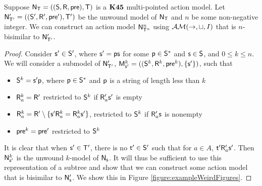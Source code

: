 \begin{lemma} \label{lemma:unwoundModelBisimilarConstruct}
  Suppose $\evM_\evT = ((\evS,\evR,\evpr),\evT)$ is a $\AXKFF$ multi-pointed
  action model.
	Let $\evM'_{\evT'} = ((\evS',\evR',\evpr'),\evT')$ be the unwound model of
  $\evM_\evT$ and $n$ be some non-negative integer.
	We can construct an action model $\evM^{n}_{\evT^{n}}$ using $\EM(\to,\sqcup,I)$ that is $n$-bisimilar to
  $\evM'_{\evT'}$.
\end{lemma}
\begin{proof}
	Consider $\evs' \in \evS'$, where $\evs' = \evp \evs$ for some $\evp \in \evS^\ast$ and $\evs \in
	\evS$, and $0 \leq k \leq n$.
	We will consider a submodel of $\evM'_{\evT'}$, $\evMM^k_{\evs'} =
	((\evS^k,\evR^k,\evpr^k),\{\evs'\})$, such that
	\begin{itemize}
		\item $\evS^k = \evs' \evp$, where $\evp \in \evS^\ast$ and $\evp$ is a string of length less
			than $k$
		\item $\evR^k_a = \evR'$ restricted to $\evS^k$ if $\evR'_a \evs'$ is empty
		\item $\evR^k_a = \evR' \setminus \{\evs' \evR^k_a = \evR^k_a \evs'\}$,
    restricted to $\evS^k$ if $\evR'_a \evs$ is nonempty
		\item $\evpr^k = \evpr'$ restricted to $\evS^k$
	\end{itemize}

	It is clear that when $\evs' \in \evT'$, there is no $\evt' \in \evS'$ such
  that for $a \in A$, $\evt' \evR'_a \evs'$.
  Then $\evM^k_{\evs'}$ is the unwound $k$-model of $\evM_\evs$.
	It will thus be sufficient to use this representation of a subtree and show that we can construct
	some action model that is bisimilar to $\evM'_\evs$.
	We show this in Figure \ref{figure:exampleWeirdFigures}.


\end{proof}
